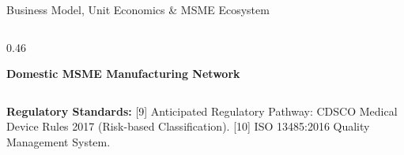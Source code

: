 \documentclass[aspectratio=169, 11pt]{beamer}
\begin{document}
\begin{frame}{Business Model, Unit Economics \& MSME Ecosystem}
\begin{columns}[c]
\begin{column}{0.46\textwidth}
\begin{block}{\textcolor{neonAmber}{\textbf{Domestic MSME Manufacturing Network}}}
                \vspace{0.2cm}
            \end{block}
        \end{column}
    \end{columns}
    
    \vspace{0.01cm}
    \begin{block}{}
        \tiny \textcolor{neonCyan}{\textbf{Regulatory Standards:}} \textcolor{mutedText}{[9] Anticipated Regulatory Pathway: CDSCO Medical Device Rules 2017 (Risk-based Classification). [10] ISO 13485:2016 Quality Management System.}
    \end{block}
\end{frame}
\end{document}
